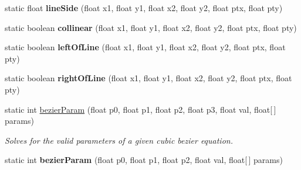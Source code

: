 \begin{DoxyCompactItemize}
\item 
\hypertarget{classhype_1_1core_1_1util_1_1_h_math_a0e677617e60db83055971620c117a07b}{static float {\bfseries line\-Side} (float x1, float y1, float x2, float y2, float ptx, float pty)}\label{classhype_1_1core_1_1util_1_1_h_math_a0e677617e60db83055971620c117a07b}

\item 
\hypertarget{classhype_1_1core_1_1util_1_1_h_math_a4113393c372043336184866df54c648f}{static boolean {\bfseries collinear} (float x1, float y1, float x2, float y2, float ptx, float pty)}\label{classhype_1_1core_1_1util_1_1_h_math_a4113393c372043336184866df54c648f}

\item 
\hypertarget{classhype_1_1core_1_1util_1_1_h_math_a860e1a0b962a8d81dde6046d8b046539}{static boolean {\bfseries left\-Of\-Line} (float x1, float y1, float x2, float y2, float ptx, float pty)}\label{classhype_1_1core_1_1util_1_1_h_math_a860e1a0b962a8d81dde6046d8b046539}

\item 
\hypertarget{classhype_1_1core_1_1util_1_1_h_math_a8c20e7da6e6cc58315b86289a87fb3db}{static boolean {\bfseries right\-Of\-Line} (float x1, float y1, float x2, float y2, float ptx, float pty)}\label{classhype_1_1core_1_1util_1_1_h_math_a8c20e7da6e6cc58315b86289a87fb3db}

\item 
static int \hyperlink{classhype_1_1core_1_1util_1_1_h_math_a8f9294fdca858a741815dce119f344d4}{bezier\-Param} (float p0, float p1, float p2, float p3, float val, float\mbox{[}$\,$\mbox{]} params)
\begin{DoxyCompactList}\small\item\em Solves for the valid parameters of a given cubic bezier equation. \end{DoxyCompactList}\item 
\hypertarget{classhype_1_1core_1_1util_1_1_h_math_a8b954fdfb9af33071a0db3f956feee88}{static int {\bfseries bezier\-Param} (float p0, float p1, float p2, float val, float\mbox{[}$\,$\mbox{]} params)}\label{classhype_1_1core_1_1util_1_1_h_math_a8b954fdfb9af33071a0db3f956feee88}


\end{DoxyCompactItemize}
